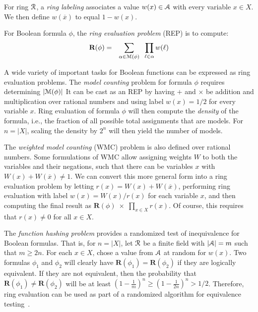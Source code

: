 \documentclass[letterpaper,USenglish,cleveref, autoref, thm-restate]{lipics-v2021}
\newcommand{\obar}[1]{\overline{#1}}
\newcommand{\lit}{\ell}
\newcommand{\varset}{X}
\newcommand{\ring}{{\cal R}}
\newcommand{\dset}{{\cal A}}
\newcommand{\rep}{\textbf{R}}
\newcommand{\radd}{+}
\newcommand{\rmul}{\times}
\newcommand{\modelset}{{\cal M}}
\begin{document}
\begin{definition}
  For ring $\ring$, a {\em ring labeling} associates a value $w(x) \in \dset$ with
  every variable $x \in \varset$.  We then define $w(\obar{x})$ to equal $1-w(x)$.

  For Boolean formula $\phi$, the {\em ring evaluation problem} (REP) is to compute:
  \begin{eqnarray}
    \rep(\phi) & = & \sum_{\alpha \in \modelset(\phi)} \;\; \prod_{\lit \in \alpha} w(\ell) \label{eqn:rep}
  \end{eqnarray}
\label{def:labeling}
\end{definition}

A wide variety of important tasks for Boolean functions can be
expressed as ring evaluation problems.  The 
{\em model counting} problem for formula $\phi$ requires determining $|\modelset(\phi)|$
It can be cast as an REP by having $\radd$ and
$\rmul$ be addition and multiplication over rational numbers and using
label $w(x) = 1/2$ for every variable $x$.  
Ring evaluation of formula $\phi$ will then compute the {\em density} of
the formula, i.e., the fraction of all possible total assignments that are
models.  For $n = |\varset|$, scaling the density by $2^n$ will then
yield the number of models.

The {\em weighted model counting} (WMC) problem is also defined over
rational numbers.  Some formulations of WMC allow 
assigning weights $W$ to both the variables and their negations, such
that there can be variables $x$ with $W(x) + W(\obar{x}) \not = 1$.  We can convert this more general form into a
ring evaluation problem by letting $r(x) = W(x) + W(\obar{x})$,
performing ring evaluation with label $w(x) = W(x)/r(x)$ for each
variable $x$, and then computing the final result as $\rep(\phi)\;
\rmul\; \prod_{x \in \varset} r(x)$.  Of course, this requires that $r(x) \not = 0$ for all $x \in \varset$.

The {\em function hashing problem} provides a randomized test
of inequivalence for Boolean formulas.  That is, for $n = |\varset|$, let $\ring$ be a
finite  field with $|\dset| = m$ such that $m \geq 2 n$.  For each $x \in \varset$, chose a value from $\dset$ at random for $w(x)$.  Two formulas
$\phi_1$ and $\phi_2$ will clearly have $\rep(\phi_1) = \rep(\phi_2)$
if they are logically equivalent.  If they are not equivalent, then
the probability that $\rep(\phi_1) \not = \rep(\phi_2)$ will be at
least $\left(1-\frac{1}{m}\right)^n \geq \left(1-\frac{1}{2n}\right)^n > 1/2$.
Therefore, ring evaluation can be used as part of a
randomized algorithm for equivalence testing~\cite{blum:ipl:1980}.
\end{document}
